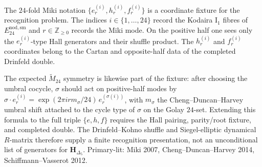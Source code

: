 \begin{remark}
\label{rem:ew-deep-2}
The $24$-fold Miki notation
$\{e^{(i)}_r,h^{(i)}_r,f^{(i)}_r\}$ is a coordinate fixture for the
recognition problem.  The indices
$i\in\{1,\dots,24\}$ record the Kodaira I$_1$ fibres of
$E^{\mathrm{nod,sm}}_{24}$ and $r\in\mathbb Z_{\ge0}$ records the Miki
mode.  On the positive half one sees only the $e^{(i)}_r$-type Hall
generators and their shuffle product.  The $h^{(i)}_r$ and
$f^{(i)}_r$ coordinates belong to the Cartan and opposite-half data of
the completed Drinfeld double.

The expected $\widetilde M_{24}$ symmetry is likewise part of the
fixture: after choosing the umbral cocycle, $\sigma$ should act on
positive-half modes by
$\sigma\cdot e^{(i)}_r =
\exp(2\pi i r m_\sigma/24)\,e^{(\sigma(i))}_r$, with $m_\sigma$ the
Cheng--Duncan--Harvey umbral shift attached to the cycle type of
$\sigma$ on the Golay $24$-set.  Extending this formula to the full
triple $\{e,h,f\}$ requires the Hall pairing, parity/root fixture, and
completed double.  The Drinfeld--Kohno shuffle and
Siegel-elliptic dynamical $R$-matrix therefore supply a finite
recognition presentation, not an unconditional list of generators for
$\mathbf H_{\Delta_5}$. Primary-lit: Miki 2007,
Cheng--Duncan--Harvey 2014, Schiffmann--Vasserot 2012.
\end{remark}
